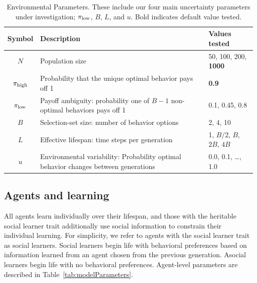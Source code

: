 \documentclass[letterpaper,11.5pt]{scrartcl}
\begin{document}
\vspace{2em}
\begin{table}[h]
\caption{Environmental Parameters. These include our four main uncertainty parameters under investigation; 
$\pi_{\mathrm{low}}$, $B$, $L$, and $u$. Bold indicates default value tested.} %
    \label{tab:uncertaintyParameters}
    \centering %
    \begin{tabular}{cp{4.0in}p{1.25in}} \toprule

        Symbol & Description & Values tested \\ 

        \midrule  
        $N$    & Population size
                 & 50, 100, 200, \textbf{1000} \\
               

        $\pi_{\mathrm{high}}$ & Probability that the unique optimal behavior pays off 1 
                & \textbf{0.9} \\

        $\pi_{\mathrm{low}}$ & Payoff ambiguity: probability one of $B - 1$ non-optimal behaviors pays off 1
                 & 0.1, 0.45, 0.8 \\ 

        $B$       & Selection-set size: number of behavior options
                  & 2, 4, 10 \\
                  
        $L$    & Effective lifespan: time steps per generation & 1, $B/2$, $B$, $2B$, $4B$ \\
        
        $u$    & Environmental variability: Probability optimal behavior changes between generations
               & 0.0, 0.1, \ldots, 1.0 \\
               
        \bottomrule
        \end{tabular} 
\end{table}



\subsection{Agents and learning}

All agents learn individually over their lifespan, and those with
the heritable social learner trait additionally use social information to constrain their individual
learning. For simplicity, we refer to agents with the social learner trait 
as social learners. 
Social learners begin life with behavioral preferences based on information learned from an agent chosen from the previous generation. Asocial learners begin life with no behavioral preferences. Agent-level parameters are described in Table~\ref{tab:modelParameters}. 
\end{document}
